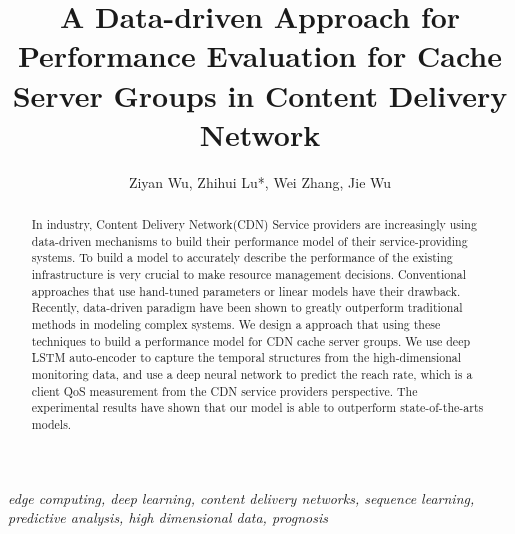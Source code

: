 \documentclass[5p]{elsarticle}
\newcommand{\dabiaolv}{reach rate}
\begin{document}
\begin{frontmatter}

\title{A Data-driven Approach for Performance Evaluation for Cache Server Groups in Content Delivery Network
    }

\author{Ziyan Wu, Zhihui Lu*, Wei Zhang, Jie Wu
    }
\address{School of Computer Science, Fudan University, Shanghai 200433, China}


\begin{abstract}
In industry, Content Delivery Network(CDN) Service providers are increasingly using data-driven mechanisms to build their performance model of their service-providing systems. To build a model to accurately describe the performance of the existing infrastructure is very crucial to make resource management decisions. Conventional approaches that use hand-tuned parameters or linear models have their drawback. Recently, data-driven paradigm have been shown to greatly outperform traditional methods in modeling complex systems. We design a approach that using these techniques to build a performance model for CDN cache server groups. We use deep LSTM auto-encoder to capture the temporal structures from the high-dimensional monitoring data, and use a deep neural network to predict the \dabiaolv, which is a client QoS measurement from the CDN service providers perspective. The experimental results have shown that our model is able to outperform state-of-the-arts models.
\end{abstract}
\begin{keyword}
\textit{edge computing, deep learning, content delivery networks, sequence learning, predictive analysis, high dimensional data, prognosis}
\end{keyword}
\end{frontmatter}
\linenumbers
\end{document}
